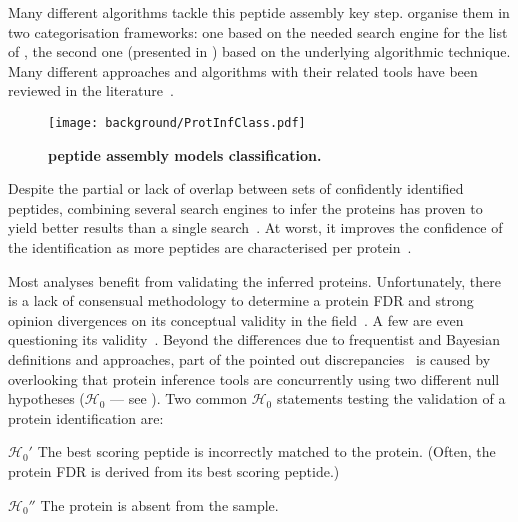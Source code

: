 Many different algorithms tackle this peptide assembly key step.
\citet{Huang2012-nr} organise them in two categorisation frameworks:
one based on the needed search engine for the list of \psms,
the second one (presented in )
based on the underlying algorithmic technique.
Many different approaches and algorithms with their related tools
have been reviewed in the literature~.\mybr\

\begin{figure}[!htb]
    \texttt{[image: background/ProtInfClass.pdf]}\centering
    \caption[Peptide assembly models classification]{\label{fig:ProtInfClass}%
    \textbf{\citet{Huang2012-nr} peptide assembly models classification.}
    }
\end{figure}

Despite the partial or lack of overlap between
sets of confidently identified peptides,
combining several search engines to infer the proteins
has proven to yield better results than a single search~.
At worst, it improves the confidence of the identification
as more peptides are characterised per protein~.\mybr\

Most analyses benefit from validating the inferred proteins.
Unfortunately,
there is a lack of consensual methodology
to determine a protein \gls{FDR}
and strong opinion divergences on its conceptual validity
in the field~.
A few are even questioning its validity~.
Beyond the differences due to frequentist and Bayesian definitions and approaches,
part of the pointed out discrepancies~ is caused by
overlooking that protein inference tools are concurrently using
two different null hypotheses ($\mathcal{H}_0$ --- see ).
Two common $\mathcal{H}_0$ statements testing
the validation of a protein identification are:\mybr\
\begin{eqlist}
    \item[$\mathcal{H}_0'$] The best scoring peptide is incorrectly matched
        to the protein.
        (Often, the protein \gls{FDR} is derived from its best scoring peptide.)
    \item[$\mathcal{H}_0''$] The protein is absent from the sample.
\end{eqlist}

